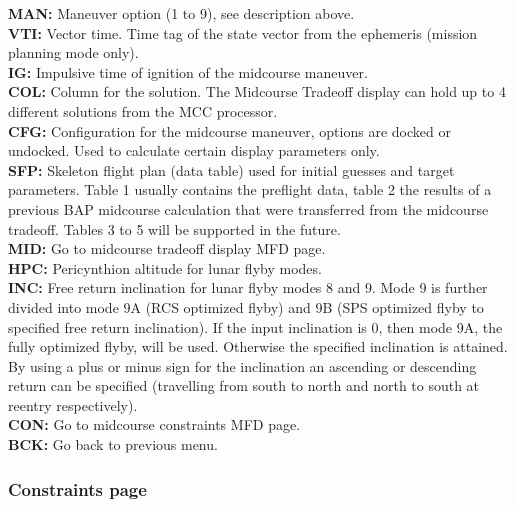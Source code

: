 \documentclass[11pt]{article} %
\begin{document}
\textbf{MAN:} Maneuver option (1 to 9), see description above.\\
\textbf{VTI:} Vector time. Time tag of the state vector from the ephemeris (mission planning mode only).\\
\textbf{IG:} Impulsive time of ignition of the midcourse maneuver.\\
\textbf{COL:} Column for the solution. The Midcourse Tradeoff display can hold up to 4 different solutions from the MCC processor.\\
\textbf{CFG:} Configuration for the midcourse maneuver, options are docked or undocked. Used to calculate certain display parameters only.\\
\textbf{SFP:} Skeleton flight plan (data table) used for initial guesses and target parameters. Table 1 usually contains the preflight data, table 2 the results of a previous BAP midcourse calculation that were transferred from the midcourse tradeoff. Tables 3 to 5 will be supported in the future.\\
\textbf{MID:} Go to midcourse tradeoff display MFD page.\\
\textbf{HPC:} Pericynthion altitude for lunar flyby modes.\\
\textbf{INC:} Free return inclination for lunar flyby modes 8 and 9. Mode 9 is further divided into mode 9A (RCS optimized flyby) and 9B (SPS optimized flyby to specified free return inclination). If the input inclination is 0, then mode 9A, the fully optimized flyby, will be used. Otherwise the specified inclination is attained. By using a plus or minus sign for the inclination an ascending or descending return can be specified (travelling from south to north and north to south at reentry respectively).\\
\textbf{CON:} Go to midcourse constraints MFD page.\\
\textbf{BCK:} Go back to previous menu.\\

\subsubsection{Constraints page}
\end{document}
